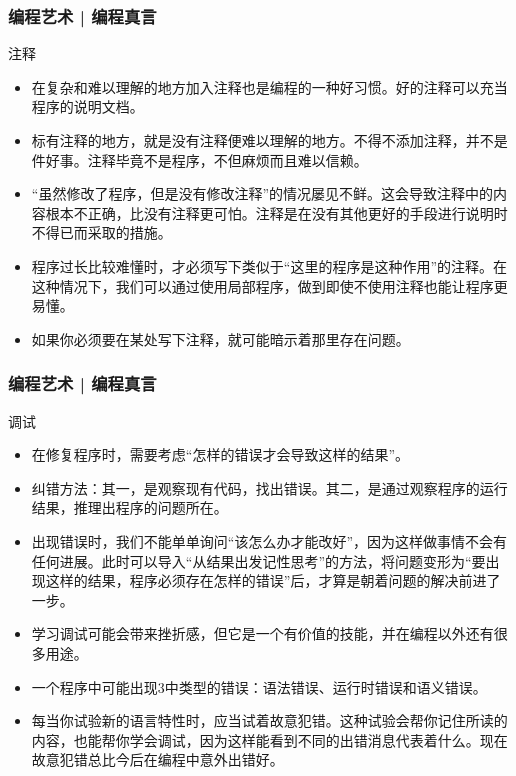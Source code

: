 \begin{frame}
  \frametitle{编程艺术 | 编程真言}
  \begin{block}{注释}
    \begin{itemize}
      \item 在复杂和难以理解的地方加入\alert{注释}也是编程的一种好习惯。好的注释可以充当程序的说明文档。
      \item 标有注释的地方，就是没有注释便难以理解的地方。不得不添加注释，并不是件好事。注释毕竟不是程序，不但麻烦而且难以信赖。
      \item “虽然修改了程序，但是没有修改注释”的情况屡见不鲜。这会导致注释中的内容根本不正确，比没有注释更可怕。注释是在没有其他更好的手段进行说明时不得已而采取的措施。
      \item 程序过长比较难懂时，才必须写下类似于“这里的程序是这种作用”的注释。在这种情况下，我们可以通过使用局部程序，做到即使不使用注释也能让程序更易懂。
      \item 如果你必须要在某处写下注释，就可能暗示着那里存在问题。
    \end{itemize}
  \end{block}
\end{frame}

\begin{frame}
  \frametitle{编程艺术 | 编程真言}
  \begin{block}{调试}
    \begin{itemize}
      \item 在修复程序时，需要考虑“怎样的错误才会导致这样的结果”。
      \item 纠错方法：其一，是观察现有代码，找出错误。其二，是通过观察程序的运行结果，推理出程序的问题所在。
      \item 出现错误时，我们不能单单询问“该怎么办才能改好”，因为这样做事情不会有任何进展。此时可以导入“从结果出发记性思考”的方法，将问题变形为“要出现这样的结果，程序必须存在怎样的错误”后，才算是朝着问题的解决前进了一步。
      \item \alert{学习调试}可能会带来挫折感，但它是一个有价值的技能，并在编程以外还有很多用途。
      \item 一个程序中可能出现3中类型的错误：语法错误、运行时错误和语义错误。
      \item 每当你试验新的语言特性时，应当试着故意犯错。这种试验会帮你记住所读的内容，也能帮你学会调试，因为这样能看到不同的出错消息代表着什么。现在故意犯错总比今后在编程中意外出错好。
    \end{itemize}
  \end{block}
\end{frame}

